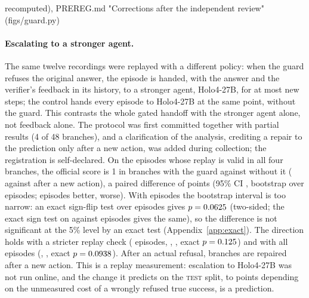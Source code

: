 recomputed), PREREG.md "Corrections after the independent review" (figs/guard.py)

\paragraph{Escalating to a stronger agent.} The same twelve recordings were replayed with a different policy: when the guard refuses the original answer, the episode is handed, with the answer and the verifier's feedback in its history, to a stronger agent, Holo4-27B, for at most \rbMaxNew{} new steps; the control hands every episode to Holo4-27B at the same point, without the guard. This contrasts the whole gated handoff with the stronger agent alone, not feedback alone. The protocol was first committed together with partial results (4 of 48 branches), and a clarification of the analysis, crediting a repair to the prediction only after a new action, was added during collection; the registration is self-declared. On the \rbPrimEpisodes{} episodes whose replay is valid in all four branches, the official score is 1 in \rbGuardSucc{} branches with the guard against \rbCtrlSucc{} without it (\rbGuardAfterAction{} against \rbCtrlAfterAction{} after a new action), a paired difference of \rbPrimDiff{} points (95\% CI \rbPrimDiffCi, bootstrap over episodes; \rbBetter{} episodes better, \rbWorse{} worse). With \rbPrimEpisodes{} episodes the bootstrap interval is too narrow: an exact sign-flip test over episodes gives $p=0.0625$ (two-sided; the exact sign test on \exRbPrimBetter{} against \exRbPrimWorse{} episodes gives the same), so the difference is not significant at the 5\% level by an exact test (Appendix~\ref{app:exact}). The direction holds with a stricter replay check (\rbStrictEpisodes{} episodes, \rbStrictDiff, \rbStrictDiffCi, exact $p=0.125$) and with all \rbAllEpisodes{} episodes (\rbAllDiff, \rbAllDiffCi, exact $p=0.0938$). After an actual refusal, \rbRefRepaired{} branches are repaired after a new action. This is a replay measurement: escalation to Holo4-27B was not run online, and the change it predicts on the \textsc{test} split, \rbPredLo{} to \rbPredHi{} points depending on the unmeasured cost of a wrongly refused true success, is a prediction. %
